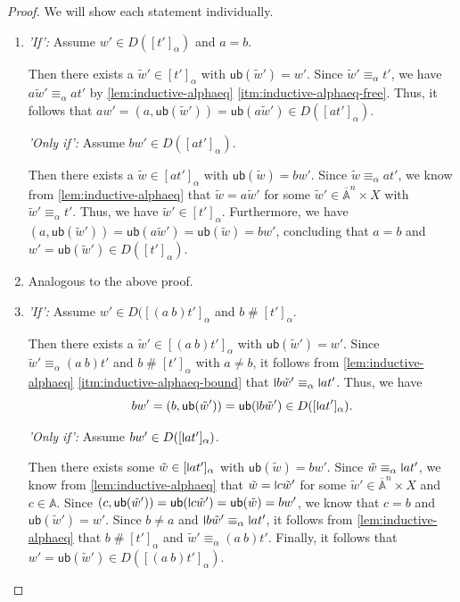 \documentclass[a4paper,UKenglish,cleveref,thm-restate,numberwithinsect,final]{lipics-v2021}
\newcommand{\Names}{\mathbb{A}}
\newcommand{\barNames}{\overline{\Names}}
\newcommand{\alphaeq}{\equiv_\alpha}
\newcommand{\fresh}{\mathbin{\#}}
\theoremstyle{plain}
\newcommand{\midmid}{\hspace{0.2ex}{\rule[-0.1ex]{0.6pt}{1.65ex}}\hspace{0.2ex}}
\newcommand{\newletter}[1]{{\midmid}#1}
\newcommand{\ub}{\mathsf{ub}}
\numberwithin{equation}{section}
\newcommand{\+}[1]{\mathcal{#1}\xspace}
\theoremstyle{definition}
\begin{document}
\begin{proof}
  We will show each statement individually.
  \begin{enumerate}
    \item
      \emph{'If':}
      Assume \(w' \in D([t']_\alpha)\) and \(a = b\).

      Then there exists a \(\tilde{w}' \in [t']_\alpha\) with \(\ub(\tilde{w}') = w'\).
      Since \(\tilde{w}' \alphaeq t'\), we have \(a\tilde{w}' \alphaeq at'\) by \autoref{lem:inductive-alphaeq} \eqref{itm:inductive-alphaeq-free}.
      Thus, it follows that \(aw' = (a, \ub(\tilde{w}')) = \ub(a\tilde{w}') \in D([at']_\alpha)\).

      \emph{'Only if':}
      Assume \(bw' \in D([at']_\alpha)\).

      Then there exists a \(\tilde{w} \in [at']_\alpha\) with \(\ub(\tilde{w}) = bw'\).
      Since \(\tilde{w} \alphaeq at'\), we know from \autoref{lem:inductive-alphaeq} that \(\tilde{w} = a\tilde{w}'\) for some \(\tilde{w}' \in \barNames^n \times X\) with \(\tilde{w}' \alphaeq t'\).
      Thus, we have \(\tilde{w}' \in [t']_\alpha\).
      Furthermore, we have \((a, \ub(\tilde{w}')) = \ub(a\tilde{w}') = \ub(\tilde{w}) = bw'\), concluding that \(a = b\) and \(w' = \ub(\tilde{w}') \in D([t']_\alpha)\).
    \item
      Analogous to the above proof.
    \item
      \emph{'If':}
      Assume \(w' \in D([(a\ b)t']_\alpha\) and \(b \fresh [t']_\alpha\).

      Then there exists a \(\tilde{w}' \in [(a\ b)t']_\alpha\) with \(\ub(\tilde{w}') = w'\).
      Since \(\tilde{w}' \alphaeq (a\ b)t'\) and \(b \fresh [t']_\alpha\) with \(a \neq b\), it follows from \autoref{lem:inductive-alphaeq} \eqref{itm:inductive-alphaeq-bound} that \(\newletter{b}\tilde{w}' \alphaeq \newletter{a}t'\).
      Thus, we have
      \begin{equation*}
        bw' = (b, \ub(\tilde{w}')) = \ub(\newletter{b}\tilde{w}') \in D([\newletter{a}t']_\alpha).
      \end{equation*}

      \emph{'Only if':}
      Assume \(bw' \in D([\newletter{a}t']_\alpha)\).

      Then there exists some \(\tilde{w} \in [\newletter{a}t']_\alpha\) with \(\ub(\tilde{w}) = bw'\).
      Since \(\tilde{w} \alphaeq \newletter{a}t'\), we know from \autoref{lem:inductive-alphaeq} that \(\tilde{w} = \newletter{c}\tilde{w}'\) for some \(\tilde{w}' \in \barNames^n \times X\) and \(c \in \Names\).
      Since \((c, \ub(\tilde{w}')) = \ub(\newletter{c}\tilde{w}') = \ub(\tilde{w}) = bw'\), we know that \(c = b\) and \(\ub(\tilde{w}') = w'\).
      Since \(b \neq a\) and \(\newletter{b}\tilde{w}' \alphaeq \newletter{a}t'\), it follows from \autoref{lem:inductive-alphaeq} that \(b \fresh [t']_\alpha\) and \(\tilde{w}' \alphaeq (a\ b)t'\).
      Finally, it follows that \(w' = \ub(\tilde{w}') \in D([(a\ b)t']_\alpha)\).
  \end{enumerate}
\end{proof}
\end{document}
